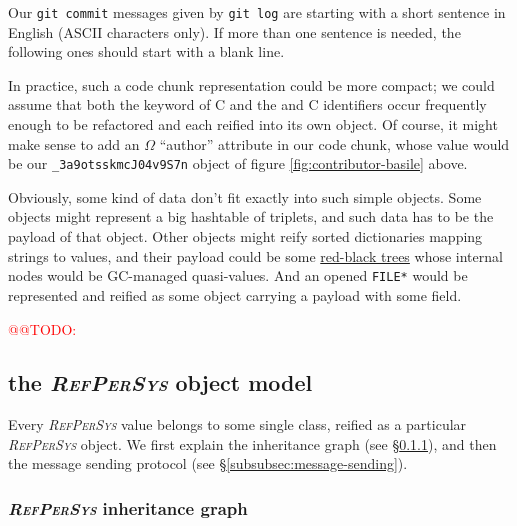 \documentclass[11pt,a4paper,svgnames]{article}
\newcommand{\RefPerSys}{{\textit{\textsc{RefPerSys}}}}
\begin{document}
Our \texttt{git commit} messages given by \texttt{git log} are
starting with a short sentence in English (ASCII characters only).  If
more than one sentence is needed, the following ones should start with
a blank line.
\clearpage

\printnoidxglossaries

In practice, such a code chunk representation could be more compact;
we could assume that both the {}
keyword of C and the {} and
{} C identifiers occur frequently enough to
be refactored and each reified into its own object. Of course, it
might make sense to add an $\Omega$ ``author'' attribute in our code
chunk, whose value would be our \texttt{\_3a9otsskmcJ04v9S7n} object
of figure \ref{fig:contributor-basile} above.
  
\bigskip

Obviously, some kind of data don't fit exactly into such simple
objects. Some objects might represent a big hashtable of triplets, and
such data has to be the payload of that object. Other objects might
reify sorted dictionaries mapping strings to values, and their
payload could be some
\href{https://en.wikipedia.org/wiki/Red-black_tree}{red-black trees}
whose internal nodes would be GC-managed quasi-values. And an opened
\texttt{FILE*} would be represented and reified as some object
carrying a payload with some {} field.

\smallskip

\textcolor{red}{@@TODO: {}}



\medskip

\subsection{the {\RefPerSys} object model}
\label{subsec:objmodel}

Every {\RefPerSys} value belongs to some single class, reified as a
particular {\RefPerSys} object. We first explain the inheritance graph
(see \S \ref{subsubsec:inheritance}), and then the message sending
protocol (see \S \ref{subsubsec:message-sending}).

\subsubsection{{\RefPerSys} inheritance graph}
\label{subsubsec:inheritance}
\end{document}
